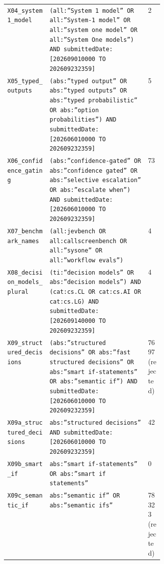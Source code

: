 {\begin{xltabular}{\linewidth}{>{\raggedright\arraybackslash}p{0.27\linewidth}Xp{0.1\linewidth}}
\texttt{\footnotesize X04\_system1\_model} & \texttt{\footnotesize (all:”System 1 model” OR all:”System-1 model” OR all:”system one model” OR all:”System One models”) AND submittedDate:[202609010000 TO 202609232359]} & 2 \\
\texttt{\footnotesize X05\_typed\_outputs} & \texttt{\footnotesize (abs:”typed output” OR abs:”typed outputs” OR abs:”typed probabilistic” OR abs:”option probabilities”) AND submittedDate:[202606010000 TO 202609232359]} & 5 \\
\texttt{\footnotesize X06\_confidence\_gating} & \texttt{\footnotesize (abs:”confidence-gated” OR abs:”confidence gated” OR abs:”selective escalation” OR abs:”escalate when”) AND submittedDate:[202606010000 TO 202609232359]} & 73 \\
\texttt{\footnotesize X07\_benchmark\_names} & \texttt{\footnotesize (all:jevbench OR all:callscreenbench OR all:”sysone” OR all:”workflow evals”)} & 4 \\
\texttt{\footnotesize X08\_decision\_models\_plural} & \texttt{\footnotesize (ti:”decision models” OR abs:”decision models”) AND (cat:cs.CL OR cat:cs.AI OR cat:cs.LG) AND submittedDate:[202609140000 TO 202609232359]} & 4 \\
\texttt{\footnotesize X09\_structured\_decisions} & \texttt{\footnotesize (abs:”structured decisions” OR abs:”fast structured decisions” OR abs:”smart if-statements” OR abs:”semantic if”) AND submittedDate:[202606010000 TO 202609232359]} & 7697 (rejected) \\
\texttt{\footnotesize X09a\_structured\_decisions} & \texttt{\footnotesize abs:”structured decisions” AND submittedDate:[202606010000 TO 202609232359]} & 42 \\
\texttt{\footnotesize X09b\_smart\_if} & \texttt{\footnotesize abs:”smart if-statements” OR abs:”smart if statements”} & 0 \\
\texttt{\footnotesize X09c\_semantic\_if} & \texttt{\footnotesize abs:”semantic if” OR abs:”semantic ifs”} & 78323 (rejected) \\
\bottomrule
\end{xltabular}}
